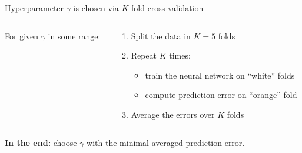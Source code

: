 \documentclass{beamer}
\def\\{}%
\begin{document}
\begin{frame}{Hyperparameter $\gamma$ is chosen via $K$-fold cross-validation}
\vspace{0.5cm}
\begin{columns}
    \begin{column}{0.3\textwidth}
        For given $\gamma$ in some range:
    \end{column}
    \begin{column}{0.7\textwidth}
        \begin{enumerate}
        \item Split the data in $K = 5$ folds
        \item Repeat $K$ times:\
            \begin{itemize}
            \item train the neural network on ``white'' folds
            \item compute prediction error on ``orange'' fold
            \end{itemize}
        \item Average the errors over $K$ folds
        \end{enumerate}
    \end{column}
\end{columns}

\vspace{0.4cm}
\textbf{In the end:} choose $\gamma$ with the minimal averaged prediction error.
\end{frame}
\end{document}
